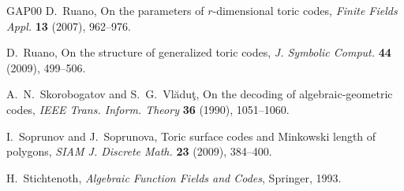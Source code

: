 \documentclass[12pt,letterpaper]{article}
\numberwithin{equation}{section}
\theoremstyle{definition}
\theoremstyle{remark}
\begin{document}
\begin{thebibliography}{GAP00}
D.~Ruano, On the parameters of $r$-dimensional toric codes, \emph{Finite
Fields Appl.} \textbf{13} (2007), 962--976.

D.~Ruano, On the structure of generalized toric codes, \emph{J. Symbolic
Comput.} \textbf{44} (2009), 499--506.

A.~N.~Skorobogatov and S.~G.~Vl\u{a}du\c{t}, On the decoding of
algebraic-geometric codes, \emph{IEEE Trans. Inform. Theory} \textbf{36}
(1990), 1051--1060.

I.~Soprunov and J.~Soprunova, Toric surface codes and Minkowski length of
polygons, \emph{SIAM J. Discrete Math.} \textbf{23} (2009), 384--400.

H.~Stichtenoth, \emph{Algebraic Function Fields and Codes}, Springer, 1993.

\end{thebibliography}
\endgroup
\end{document}
